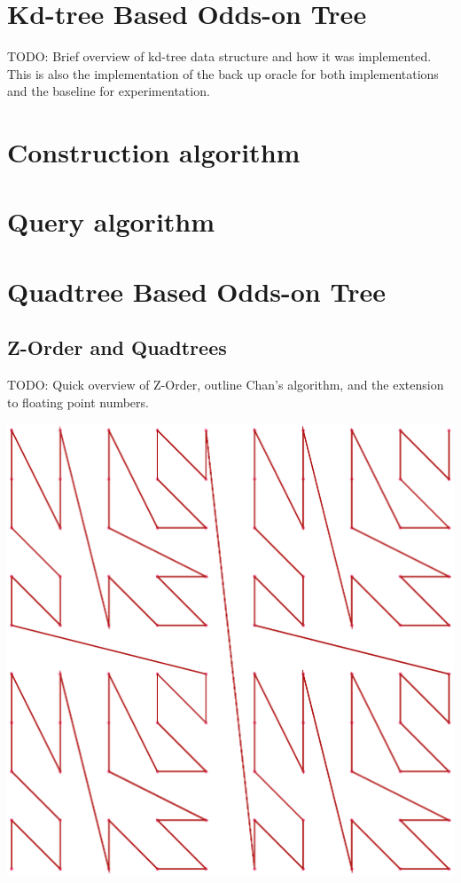 \documentclass[mcs]{scsthesis}
\begin{document}
\section{Kd-tree Based Odds-on Tree}

TODO: Brief overview of kd-tree data structure and how it was implemented.  This
is also the implementation of the back up oracle for both implementations and the
baseline for experimentation. 

\section{Construction algorithm}

\section{Query algorithm}

\section{Quadtree Based Odds-on Tree}

\subsection{Z-Order and Quadtrees}

TODO: Quick overview of Z-Order, outline Chan's algorithm, and the extension to
floating point numbers.

\includegraphics[scale=0.4]{diagrams/zorder.eps}
\end{document}
